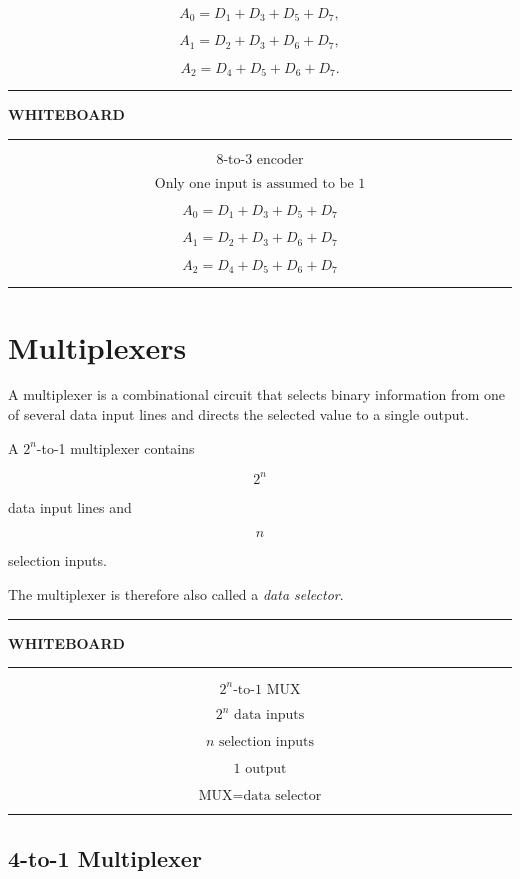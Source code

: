 \documentclass[11pt]{article}
\newenvironment{whiteboard}
{
    \par\medskip
    \hrule
    \vspace{0.35em}
    \noindent\textbf{\large WHITEBOARD}
    \par\vspace{0.3em}
    \hrule
    \vspace{0.65em}
}
{
    \vspace{0.45em}
    \hrule
    \par\medskip
}
\begin{document}
\[
A_0=D_1+D_3+D_5+D_7,
\]

\[
A_1=D_2+D_3+D_6+D_7,
\]

\[
A_2=D_4+D_5+D_6+D_7.
\]

\begin{whiteboard}

\[
\boxed{
8\text{-to-}3\text{ encoder}
}
\]

\[
\boxed{
\text{Only one input is assumed to be }1
}
\]

\[
A_0=D_1+D_3+D_5+D_7
\]

\[
A_1=D_2+D_3+D_6+D_7
\]

\[
A_2=D_4+D_5+D_6+D_7
\]

\end{whiteboard}

\section{Multiplexers}

A multiplexer is a combinational circuit that selects binary information from
one of several data input lines and directs the selected value to a single
output.

A \(2^n\)-to-1 multiplexer contains

\[
2^n
\]

data input lines and

\[
n
\]

selection inputs.

The multiplexer is therefore also called a \emph{data selector}.

\begin{whiteboard}

\[
\boxed{
2^n\text{-to-}1\text{ MUX}
}
\]

\[
2^n\text{ data inputs}
\]

\[
n\text{ selection inputs}
\]

\[
1\text{ output}
\]

\[
\boxed{\text{MUX}=\text{data selector}}
\]

\end{whiteboard}

\subsection{4-to-1 Multiplexer}
\end{document}
